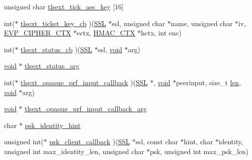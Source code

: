 \begin{DoxyCompactItemize}
\item 
unsigned char \hyperlink{structssl__ctx__st_af9722f587997ab60d353ef54772c75a7}{tlsext\+\_\+tick\+\_\+aes\+\_\+key} \mbox{[}16\mbox{]}
\item 
int($\ast$ \hyperlink{structssl__ctx__st_acf00005001fd1cc9fd19d5401cc41d6c}{tlsext\+\_\+ticket\+\_\+key\+\_\+cb} )(\hyperlink{crypto_2ossl__typ_8h_a71f21e09bf365489dab9d85bd4785e24}{S\+SL} $\ast$ssl, unsigned char $\ast$name, unsigned char $\ast$iv, \hyperlink{crypto_2ossl__typ_8h_aab2bd6a044e1d31ebc2fe82b3b0b3d9a}{E\+V\+P\+\_\+\+C\+I\+P\+H\+E\+R\+\_\+\+C\+TX} $\ast$ectx, \hyperlink{crypto_2hmac_2hmac_8h_aac042740b33d6ad59d219de07a6f8461}{H\+M\+A\+C\+\_\+\+C\+TX} $\ast$hctx, int enc)
\item 
int($\ast$ \hyperlink{structssl__ctx__st_ad4c6bfd6ad1b4929649d645cae3a8838}{tlsext\+\_\+status\+\_\+cb} )(\hyperlink{crypto_2ossl__typ_8h_a71f21e09bf365489dab9d85bd4785e24}{S\+SL} $\ast$ssl, \hyperlink{hw__4758__cca_8h_afad4d591c7931ff6dc5bf69c76c96aa0}{void} $\ast$arg)
\item 
\hyperlink{hw__4758__cca_8h_afad4d591c7931ff6dc5bf69c76c96aa0}{void} $\ast$ \hyperlink{structssl__ctx__st_a30290aa35e636b55826d49768bfe15ed}{tlsext\+\_\+status\+\_\+arg}
\item 
int($\ast$ \hyperlink{structssl__ctx__st_aeeecc2d6865411f7c0300111d18a230e}{tlsext\+\_\+opaque\+\_\+prf\+\_\+input\+\_\+callback} )(\hyperlink{crypto_2ossl__typ_8h_a71f21e09bf365489dab9d85bd4785e24}{S\+SL} $\ast$, \hyperlink{hw__4758__cca_8h_afad4d591c7931ff6dc5bf69c76c96aa0}{void} $\ast$peerinput, size\+\_\+t \hyperlink{include_2openssl_2x509_8h_ad8c3db4434e9cb5cd772cc009f40e856}{len}, \hyperlink{hw__4758__cca_8h_afad4d591c7931ff6dc5bf69c76c96aa0}{void} $\ast$arg)
\item 
\hyperlink{hw__4758__cca_8h_afad4d591c7931ff6dc5bf69c76c96aa0}{void} $\ast$ \hyperlink{structssl__ctx__st_a655714f0ea7064ffb46f3cb97e986f98}{tlsext\+\_\+opaque\+\_\+prf\+\_\+input\+\_\+callback\+\_\+arg}
\item 
char $\ast$ \hyperlink{structssl__ctx__st_ac93ab51ca7a64a11e87278ef4ab3fcd9}{psk\+\_\+identity\+\_\+hint}
\item 
unsigned int($\ast$ \hyperlink{structssl__ctx__st_a71fd3455fac589a1f9bdc9f8520aa4e5}{psk\+\_\+client\+\_\+callback} )(\hyperlink{crypto_2ossl__typ_8h_a71f21e09bf365489dab9d85bd4785e24}{S\+SL} $\ast$ssl, const char $\ast$hint, char $\ast$identity, unsigned int max\+\_\+identity\+\_\+len, unsigned char $\ast$psk, unsigned int max\+\_\+psk\+\_\+len)
\item 

\end{DoxyCompactItemize}
